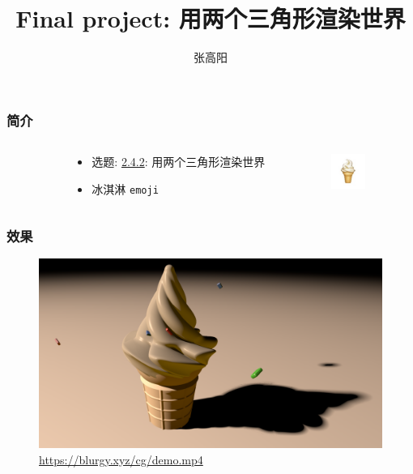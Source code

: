 \documentclass[aspectratio=169]{ctexbeamer} %
\title{Final project: 用两个三角形渲染世界}
\author{张高阳}
\begin{document}
\begin{frame}
    \titlepage 
\end{frame}

\begin{frame}
    \frametitle{简介}
    \begin{columns}
        \begin{column}{.1\textwidth}\end{column}
        \begin{column}{.5\textwidth}
            \begin{itemize}
                \item 选题: \underline{2.4.2}: 用两个三角形渲染世界
                \item 冰淇淋 \texttt{emoji}
            \end{itemize}
        \end{column}
        \begin{column}{.4\textwidth}
            \includegraphics[width=32pt]{images/pre/emoji.pdf}
        \end{column}
    \end{columns}
\end{frame}

\begin{frame}
    \frametitle{效果}
    \begin{figure}[htbp]
        \centering
        \includegraphics[height=.75\textheight]{images/pre/full.pdf}
        \caption{\url{https://blurgy.xyz/cg/demo.mp4}}
        \label{fig:full}
    \end{figure}
\end{frame}
\end{document}
